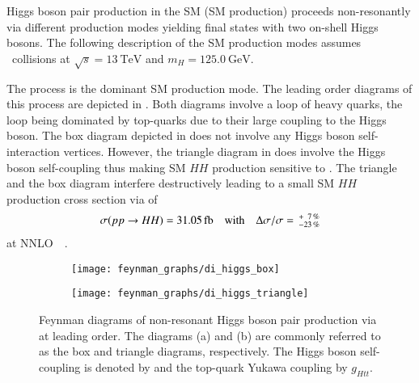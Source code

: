 Higgs boson pair production in the SM (SM \HH production) proceeds
non-resonantly via different production modes yielding final states with two
on-shell Higgs bosons. The following description of the SM \HH production modes
assumes \pp~collisions at $\sqrt{s} = \SI{13}{\TeV}$ and
$m_{H} = \SI{125.0}{\GeV}$.

The \ggF process is the dominant SM \HH production mode. The leading order
diagrams of this process are depicted in . Both
diagrams involve a loop of heavy quarks, the loop being dominated by top-quarks
due to their large coupling to the Higgs boson. The box diagram depicted in
 does not involve any Higgs boson
self-interaction vertices.
However, the triangle diagram in
 does involve the Higgs boson self-coupling
thus making SM $HH$ production sensitive to \lambdahhh. The triangle and
the box diagram interfere destructively leading to a small SM $HH$ production
cross section via \ggF of
\begin{align*}
  \sigma(pp \to HH) = \SI{31.05}{\femto\barn}
  \quad \text{with} \quad
  \Delta \sigma / \sigma = \valuesep^{+\phantom{2}7\,\%}_{-23\,\%}
\end{align*}
at NNLO~\FTapprox~\cite{Grazzini:2018bsd,Baglio:2020wgt,LHCHWGHH}.

\begin{figure}[htbp]
  \centering

  \begin{subfigure}{0.49\textwidth}
    \centering
    \texttt{[image: feynman\_graphs/di\_higgs\_box]}
    \subcaption{}%
    \label{fig:dihiggs_ggf_feyn_box}
  \end{subfigure}\hfill%
  \begin{subfigure}{0.49\textwidth}
    \centering
    \texttt{[image: feynman\_graphs/di\_higgs\_triangle]}
    \subcaption{}%
    \label{fig:dihiggs_ggf_feyn_triangle}
  \end{subfigure}

  \caption[Feynman diagrams of non-resonant Higgs boson pair production via
  \ggF.]{Feynman diagrams of non-resonant Higgs boson pair production via \ggF
    at leading order. The diagrams (a) and (b) are commonly referred to as the
    box and triangle diagrams, respectively. The Higgs boson self-coupling is
    denoted by \lambdahhh and the top-quark Yukawa coupling by $g_{Htt}$.}%
  \label{fig:dihiggs_ggf_feyn}
\end{figure}

